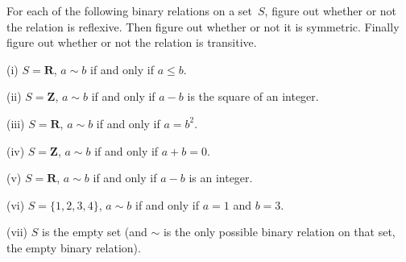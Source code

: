 \documentclass[10pt]{article}
\newcommand{\R}{\mathbf{R}}
\newcommand{\Z}{\mathbf{Z}}
\begin{document}
\medskip{} For each of the following binary relations on a set~$S$, figure out whether or not the relation is reflexive. Then figure out whether or not it is symmetric. Finally figure out whether or not the relation is transitive.

(i) $S=\R$, $a\sim b$ if and only if $a\leq b$.

(ii) $S=\Z$, $a\sim b$ if and only if $a-b$ is the square of an integer.

(iii) $S=\R$, $a\sim b$ if and only if $a=b^2$.

(iv) $S=\Z$, $a\sim b$ if and only if $a+b=0$.

(v) $S=\R$, $a\sim b$ if and only if $a-b$ is an integer.

(vi) $S=\{1,2,3,4\}$, $a\sim b$ if and only if $a=1$ and $b=3$.

(vii) $S$ is the empty set (and $\sim$ is the only possible binary relation on that set, the empty binary relation). 
\end{document}
